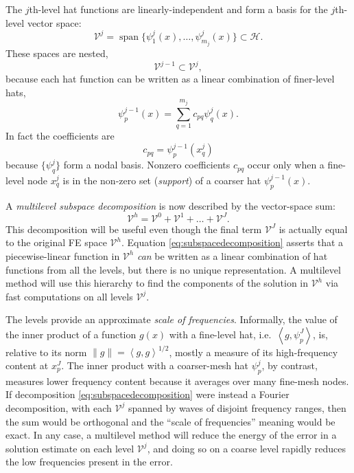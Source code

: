 \documentclass[letterpaper,final,12pt,reqno]{amsart}
\theoremstyle{claim}
\newcommand{\ip}[2]{\left<#1,#2\right>}
\numberwithin{equation}{section}
\numberwithin{figure}{section}
\numberwithin{table}{section}
\begin{document}
The $j$th-level hat functions are linearly-independent and form a basis for the $j$th-level vector space:
\begin{equation}
  \mathcal{V}^j = \operatorname{span}\{\psi_1^j(x),\dots,\psi_{m_j}^j(x)\} \subset \mathcal{H}.  \label{eq:definevk}
\end{equation}
These spaces are nested,
\begin{equation}
  \mathcal{V}^{j-1} \subset \mathcal{V}^j,  \label{eq:nestedvk}
\end{equation}
because each hat function can be written as a linear combination of finer-level hats,
\begin{equation}
   \psi_p^{j-1}(x) = \sum_{q=1}^{m_j} c_{pq} \psi_q^j(x). \label{eq:hatcombination}
\end{equation}
In fact the coefficients are
\begin{equation}
  c_{pq} = \psi_p^{j-1}(x_q^j) \label{eq:nodalcoefficients}
\end{equation}
because $\{\psi_q^j\}$ form a nodal basis.  Nonzero coefficients $c_{pq}$ occur only when a fine-level node $x_q^j$ is in the non-zero set (\emph{support}) of a coarser hat $\psi_p^{j-1}(x)$.

A \emph{multilevel subspace decomposition} is now described by the vector-space sum:
\begin{equation}
  \mathcal{V}^h = \mathcal{V}^0 + \mathcal{V}^1 + \dots + \mathcal{V}^J. \label{eq:subspacedecomposition}
\end{equation}
This decomposition will be useful even though the final term $\mathcal{V}^J$ is actually equal to the original FE space $\mathcal{V}^h$.  Equation \eqref{eq:subspacedecomposition} asserts that a piecewise-linear function in $\mathcal{V}^h$ \emph{can} be written as a linear combination of hat functions from all the levels, but there is no unique representation.  A multilevel method will use this hierarchy to find the components of the solution in $\mathcal{V}^h$ via fast computations on all levels $\mathcal{V}^j$.

The levels provide an approximate \emph{scale of frequencies}.  Informally, the value of the inner product of a function $g(x)$ with a fine-level hat, i.e.~$\ip{g}{\psi_p^J}$, is, relative to its norm $\|g\| = \ip{g}{g}^{1/2}$, mostly a measure of its high-frequency content at $x_p^J$.  The inner product with a coarser-mesh hat $\psi_p^j$, by contrast, measures lower frequency content because it averages over many fine-mesh nodes.  If decomposition \eqref{eq:subspacedecomposition} were instead a Fourier decomposition, with each $\mathcal{V}^j$ spanned by waves of disjoint frequency ranges, then the sum would be orthogonal and the ``scale of frequencies'' meaning would be exact.  In any case, a multilevel method will reduce the energy of the error in a solution estimate on each level $\mathcal{V}^j$, and doing so on a coarse level rapidly reduces the low frequencies present in the error.
\end{document}
